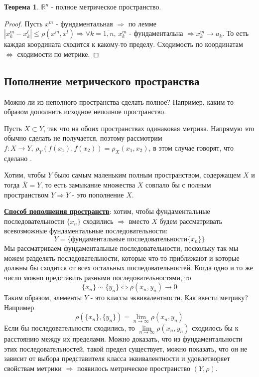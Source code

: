 \documentclass[12pt]{article}
\newcommand{\MR}{\mathbb{R}}
\theoremstyle{definition}
\newtheorem{theorem}{Теорема}
\begin{document}
\begin{theorem}
	$\MR^n$ - полное метрическое пространство.
\end{theorem}
\begin{proof}
	Пусть $x^m$ - фундаментальная $\Rightarrow$ по лемме $|x_k^m - x_k^l| \leq \rho(x^m,x^l) \Rightarrow \forall k = \overline{1,n}, \, x_k^m$ - фундаментальна $\Rightarrow x_k^m \to a_k$. То есть каждая координата сходится к какому-то пределу. Сходимость по координатам $\Leftrightarrow$ сходимости по метрике. 
\end{proof}

\subsection*{Пополнение метрического пространства}
Можно ли из неполного пространства сделать полное? Например, каким-то образом дополнить исходное неполное пространство. 

Пусть $X \subset Y$, так что на обоих пространствах одинаковая метрика. Напрямую это обычно сделать не получается, поэтому рассмотрим $f\colon X \to Y, \, \rho_Y(f(x_1),f(x_2)) = \rho_X(x_1,x_2)$, в этом случае говорят, что сделано . 

Хотим, чтобы $Y$ было самым маленьким полным пространством, содержащем $X$ и тогда $\overline{X} = Y$, то есть замыкание множества $X$ совпало бы с полным пространством $Y \Rightarrow Y$ - это пополнение $X$. 

\uline{\textbf{Способ пополнения пространств}}: хотим, чтобы фундаментальные последовательности $\{x_n\}$ сходились $\Rightarrow$ вместо $X$ будем рассматривать всевозможные фундаментальные последовательности:
$$
Y = \{\text{фундаментальные последовательности} \{x_n\}\}
$$ 
Мы рассматриваем фундаментальные последовательности, поскольку так мы можем разделять последовательности, которые что-то приближают и которые должны бы сходится от всех остальных последовательностей. Когда одно и то же число можно представить разными последовательностями, то
$$
\{x_n\} \sim \{y_n\} \Leftrightarrow \rho(x_n,y_n) \to 0
$$ 
Таким образом, элементы $Y$ - это классы эквивалентности. Как ввести метрику? Например 
$$
\rho(\{x_n\},\{y_n\})= \lim\limits_{n \to \infty}\rho(x_n,y_n)
$$ 
Если бы последовательности сходились, то $\lim\limits_{n \to \infty}\rho(x_n,y_n)$ сходилось бы к расстоянию между их пределами. Можно доказать, что из фундаментальности этих последовательностей, такой предел существует, можно показать, что он не зависит от выбора представителя класса эквивалентности и удовлетворяет свойствам метрики $\Rightarrow$ появилось метрическое пространство $(Y,\rho)$. 
\end{document}
